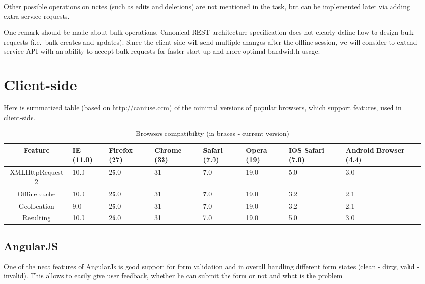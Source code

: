 \documentclass[12pt,a4paper]{article}
\begin{document}
Other possible operations on notes (such as edits and deletions) are not mentioned in the task, but can be implemented later via adding extra service requests.

One remark should be made about bulk operations.
Canonical REST architecture specification does not clearly define how to design bulk requests (i.e.\ bulk creates and updates).
Since the client-side will send multiple changes after the offline session, we will consider to extend service API with an ability to accept bulk requests
for faster start-up and more optimal bandwidth usage.

\section{Client-side}

Here is summarized table (based on \url{http://caniuse.com}) of the minimal
versions of popular browsers, which support features, used in client-side.

\begin{table}[h!]
    \caption{Browsers compatibility (in braces - current version)}
    \begin{tabularx}{\linewidth}{|c|X|X|X|X|X|X|X|}
        \hline
        Feature & IE (11.0) & Firefox (27) & Chrome (33) & Safari (7.0) & Opera (19) & IOS Safari (7.0) & Android Browser (4.4) \\ \hline
        XMLHttpRequest 2 & 10.0 & 26.0 & 31 & 7.0 & 19.0 & 5.0 & 3.0 \\ \hline
        Offline cache    & 10.0 & 26.0 & 31 & 7.0 & 19.0 & 3.2 & 2.1 \\ \hline
        Geolocation      &  9.0 & 26.0 & 31 & 7.0 & 19.0 & 3.2 & 2.1 \\ \hline
        \hline
        Resulting        & 10.0 & 26.0 & 31 & 7.0 & 19.0 & 5.0 & 3.0 \\ \hline
    \end{tabularx}
\end{table}

\subsection{AngularJS}

One of the neat features of AngularJs is good support for form validation and in overall
handling different form states (clean - dirty, valid - invalid). This allows to 
easily give user feedback, whether he can submit the form or not and what is the problem.
\end{document}
